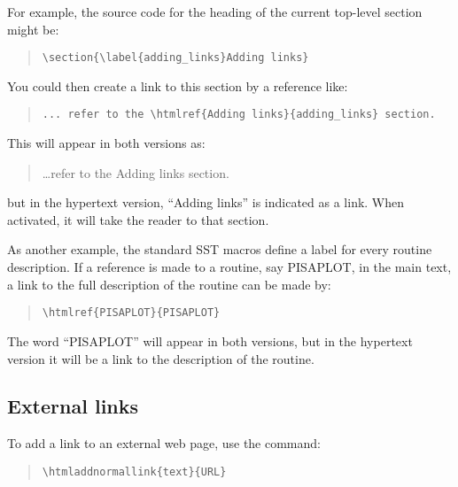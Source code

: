 \documentclass[twoside,11pt]{article}
\newcommand{\htmladdnormallink}[2]{#1}
\newcommand{\htmlref}[2]{#1}
\newcommand{\xlabel}[1]{}
\renewcommand{\_}{\texttt{\symbol{95}}}
\begin{document}
For example, the source code for the heading of the current top-level section
might be:

\begin{quote}
\verb+\section{\label{adding_links}Adding links}+
\end{quote}

You could then create a link to this section by a reference like:

\begin{quote}
\verb+... refer to the \htmlref{Adding links}{adding_links} section.+
\end{quote}

This will appear in both versions as:

\begin{quote}
\ldots refer to the Adding links section.
\end{quote}

but in the hypertext version, ``Adding links'' is indicated as a link.
When activated, it will take the reader to that section.

As another example, the standard SST macros define a label for every routine
description.
If a reference is made to a routine, say PISAPLOT, in the main text, a link
to the full description of the routine can be made by:

\begin{quote}
\begin{verbatim}
\htmlref{PISAPLOT}{PISAPLOT}
\end{verbatim}
\end{quote}

The word ``PISAPLOT'' will appear in both versions, but in the hypertext version
it will be a link to the description of the routine.

\subsection{\xlabel{external_links}External links}

To add a link to an external web page, use the command:

\begin{quote}
\begin{verbatim}
\htmladdnormallink{text}{URL}
\end{verbatim}
\end{quote}
\end{document}
